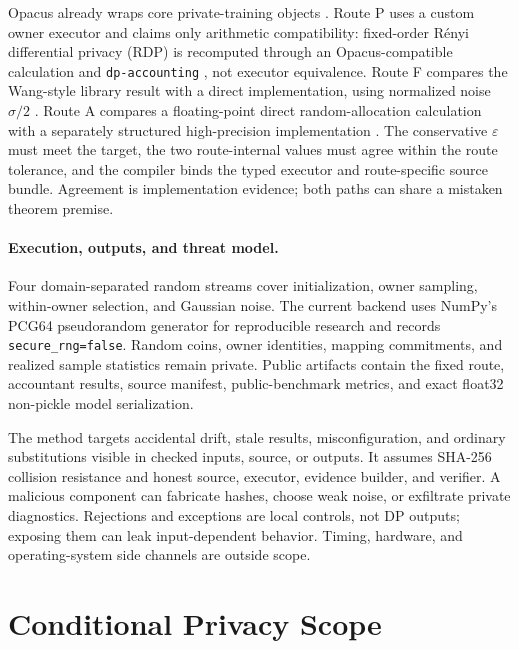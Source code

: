 \documentclass[letterpaper]{article}
\begin{document}
Opacus already wraps core private-training objects
\citep{yousefpour2021opacus}.  Route P uses a custom owner executor and claims
only arithmetic compatibility: fixed-order R\'enyi differential privacy (RDP)
is recomputed through an Opacus-compatible calculation and
\texttt{dp-accounting} \citep{dpaccounting},
not executor equivalence.  Route F compares the Wang-style library result with
a direct implementation, using normalized noise $\sigma/2$
\citep{wang2019subsampled}.  Route A compares a floating-point direct
random-allocation calculation with a separately structured high-precision
implementation \citep{shenfeld2025randomallocation}.  The conservative
$\varepsilon$ must meet the target, the two route-internal values must agree
within the route tolerance, and the compiler binds the typed executor and
route-specific source bundle.  Agreement is implementation evidence; both
paths can share a mistaken theorem premise.

\paragraph{Execution, outputs, and threat model.}
Four domain-separated random streams cover initialization, owner sampling,
within-owner selection, and Gaussian noise.  The current backend uses NumPy's
PCG64 pseudorandom generator for reproducible research and records
\texttt{secure\_rng=false}.
Random coins, owner identities, mapping commitments, and realized sample
statistics remain private.  Public artifacts contain the fixed route,
accountant results, source manifest, public-benchmark metrics, and exact
float32 non-pickle model serialization.

The method targets accidental drift, stale results, misconfiguration, and
ordinary substitutions visible in checked inputs, source, or outputs.  It
assumes SHA-256 collision resistance and honest source, executor, evidence
builder, and verifier.  A malicious component can fabricate hashes, choose
weak noise, or exfiltrate private diagnostics.  Rejections and exceptions are
local controls, not DP outputs; exposing them can leak input-dependent
behavior.  Timing, hardware, and operating-system side channels are outside
scope.

\section{Conditional Privacy Scope}
\end{document}
